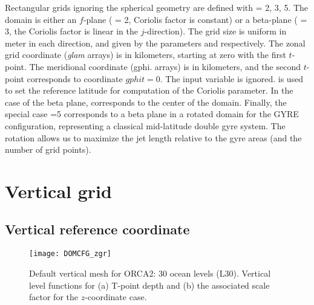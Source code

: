 \documentclass[../main/NEMO_manual]{subfiles}
\begin{document}
Rectangular grids ignoring the spherical geometry are defined with
 = 2, 3, 5. The domain is either an $f$-plane ( = 2,
Coriolis factor is constant) or a beta-plane ( = 3, the Coriolis factor
is linear in the $j$-direction). The grid size is uniform in meter in each direction,
and given by the parameters  and  respectively.
The zonal grid coordinate (\textit{glam} arrays) is in kilometers, starting at zero
with the first $t$-point. The meridional coordinate (gphi. arrays) is in kilometers,
and the second $t$-point corresponds to coordinate $gphit=0$. The input
variable  is ignored.  is used to set the reference
latitude for computation of the Coriolis parameter. In the case of the beta plane,
 corresponds to the center of the domain. Finally, the special case
=5 corresponds to a beta plane in a rotated domain for the
GYRE configuration, representing a classical mid-latitude double gyre system.
The rotation allows us to maximize the jet length relative to the gyre areas
(and the number of grid points).

\section{Vertical grid}
\label{sec:DOMCFG_vert}

\subsection{Vertical reference coordinate}
\label{sec:DOMCFG_zref}

\begin{figure}[!tb]
  \centering
  \texttt{[image: DOMCFG\_zgr]}
  \caption[DOMAINcfg: default vertical mesh for ORCA2]{
    Default vertical mesh for ORCA2: 30 ocean levels (L30).
    Vertical level functions for (a) T-point depth and (b) the associated scale factor for
    the $z$-coordinate case.}
  \label{fig:DOMCFG_zgr}
\end{figure}
\end{document}
